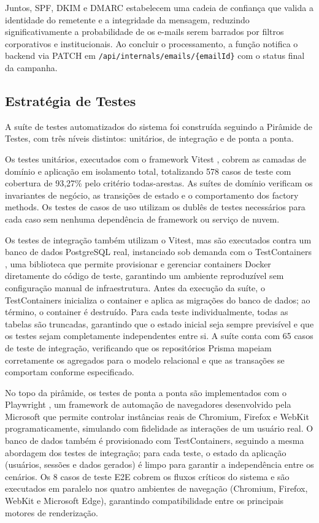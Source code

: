 \documentclass[article,a4paper,12pt,brazil,sumario=tradicional]{abntex2}
\begin{document}
Juntos, SPF, DKIM e DMARC estabelecem uma cadeia de confiança que valida a identidade do remetente e a integridade da mensagem, reduzindo significativamente a probabilidade de os e-mails serem barrados por filtros corporativos e institucionais. Ao concluir o processamento, a função notifica o backend via PATCH em \texttt{/api/internals/emails/\{emailId\}} com o status final da campanha.

\subsection{Estratégia de Testes}

A suíte de testes automatizados do sistema foi construída seguindo a Pirâmide de Testes, com três níveis distintos: unitários, de integração e de ponta a ponta.

Os testes unitários, executados com o framework Vitest \cite{vitest}, cobrem as camadas de domínio e aplicação em isolamento total, totalizando 578 casos de teste com cobertura de 93,27\% pelo critério todas-arestas. As suítes de domínio verificam os invariantes de negócio, as transições de estado e o comportamento dos factory methods. Os testes de casos de uso utilizam os dublês de testes necessários para cada caso sem nenhuma dependência de framework ou serviço de nuvem.

Os testes de integração também utilizam o Vitest, mas são executados contra um banco de dados PostgreSQL real, instanciado sob demanda com o TestContainers \cite{testcontainers}, uma biblioteca que permite provisionar e gerenciar containers Docker diretamente do código de teste, garantindo um ambiente reproduzível sem configuração manual de infraestrutura. Antes da execução da suíte, o TestContainers inicializa o container e aplica as migrações do banco de dados; ao término, o container é destruído. Para cada teste individualmente, todas as tabelas são truncadas, garantindo que o estado inicial seja sempre previsível e que os testes sejam completamente independentes entre si. A suíte conta com 65 casos de teste de integração, verificando que os repositórios Prisma mapeiam corretamente os agregados para o modelo relacional e que as transações se comportam conforme especificado.

No topo da pirâmide, os testes de ponta a ponta são implementados com o Playwright \cite{playwright}, um framework de automação de navegadores desenvolvido pela Microsoft que permite controlar instâncias reais de Chromium, Firefox e WebKit programaticamente, simulando com fidelidade as interações de um usuário real. O banco de dados também é provisionado com TestContainers, seguindo a mesma abordagem dos testes de integração; para cada teste, o estado da aplicação (usuários, sessões e dados gerados) é limpo para garantir a independência entre os cenários. Os 8 casos de teste E2E cobrem os fluxos críticos do sistema e são executados em paralelo nos quatro ambientes de navegação (Chromium, Firefox, WebKit e Microsoft Edge), garantindo compatibilidade entre os principais motores de renderização.
\end{document}

